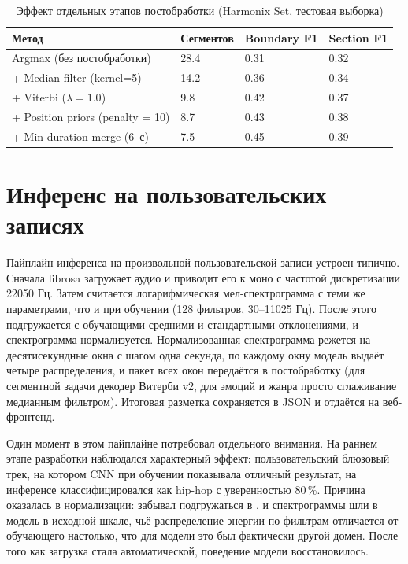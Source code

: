 \begin{table}[H]
\centering
\caption{Эффект отдельных этапов постобработки (Harmonix Set, тестовая выборка)}
\label{tab:postprocess-effect}
\begin{tabular}{L{5cm}L{2cm}L{2.5cm}L{2.5cm}}
\toprule
Метод & Сегментов & Boundary F1 & Section F1 \\
\midrule
Argmax (без постобработки) & 28.4 & 0.31 & 0.32 \\
+ Median filter (kernel=5) & 14.2 & 0.36 & 0.34 \\
+ Viterbi ($\lambda = 1.0$) & 9.8 & 0.42 & 0.37 \\
+ Position priors (penalty = 10) & 8.7 & 0.43 & 0.38 \\
+ Min-duration merge (6~с) & 7.5 & 0.45 & 0.39 \\
\bottomrule
\end{tabular}
\end{table}

\section{Инференс на пользовательских записях}\label{sec:4-8}

Пайплайн инференса на произвольной пользовательской записи устроен типично. Сначала librosa загружает аудио и приводит его к моно с частотой дискретизации 22050 Гц. Затем считается логарифмическая мел-спектрограмма с теми же параметрами, что и при обучении (128 фильтров, 30--11025 Гц). После этого подгружается  с обучающими средними и стандартными отклонениями, и спектрограмма нормализуется. Нормализованная спектрограмма режется на десятисекундные окна с шагом одна секунда, по каждому окну модель выдаёт четыре распределения, и пакет всех окон передаётся в постобработку (для сегментной задачи декодер Витерби v2, для эмоций и жанра просто сглаживание медианным фильтром). Итоговая разметка сохраняется в JSON и отдаётся на веб-фронтенд.

Один момент в этом пайплайне потребовал отдельного внимания. На раннем этапе разработки наблюдался характерный эффект: пользовательский блюзовый трек, на котором CNN при обучении показывала отличный результат, на инференсе классифицировался как hip-hop с уверенностью 80\,\%. Причина оказалась в нормализации:  забывал подгружаться в , и спектрограммы шли в модель в исходной шкале, чьё распределение энергии по фильтрам отличается от обучающего настолько, что для модели это был фактически другой домен. После того как загрузка  стала автоматической, поведение модели восстановилось.

